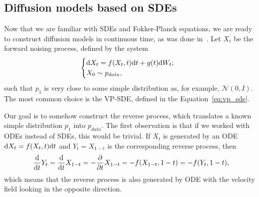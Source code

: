 \subsection{Diffusion models based on SDEs}
Now that we are familiar with SDEs and Fokker-Planck equations, we are ready to construct diffusion models in continuous time, as was done in~\cite{song2020score}. Let $X_t$ be the forward noising process, defined by the system
\[
    \begin{cases}
        \mathrm{d} X_t = f(X_t, t) \mathrm{d} t + g(t) \mathrm{d} W_t;\\
        X_0 \sim p_{data},
    \end{cases}
\]
such that $p_{1}$ is very close to some simple distribution as, for example, $\mathcal{N}(0, I)$. The most common choice is the VP-SDE, defined in the Equation~\ref{eq:vp_sde}. 

Our goal is to somehow construct the reverse process, which translates a known simple distribution $p_1$ into $p_{data}$. The first observation is that if we worked with ODEs instead of SDEs, this would be trivial. If $X_t$ is generated by an ODE $\mathrm{d} X_t = f(X_t, t) \mathrm{d} t$ and $Y_t = X_{1 - t}$ is the corresponding reverse process, then
\[
    \frac{\mathrm{d}}{\mathrm{d} t} Y_t = \frac{\mathrm{d}}{\mathrm{d} t} X_{1 - t} = - \frac{\partial}{\partial t} X_{1 - t} = - f(X_{1 - t}, 1 - t) = -f(Y_t, 1 - t),
\]
which means that the reverse process is also generated by ODE with the velocity field looking in the opposite direction.

